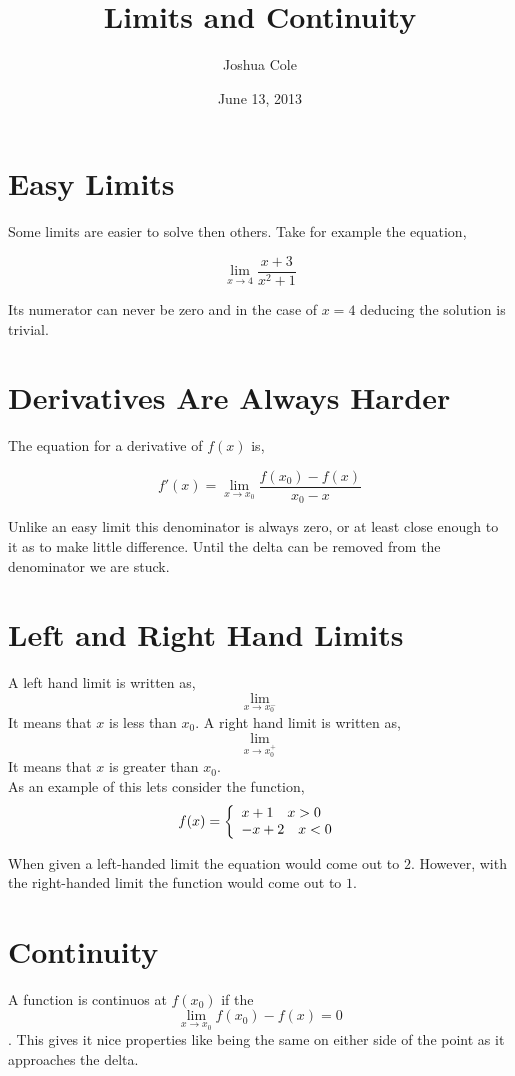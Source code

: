 \documentclass {article}
\begin{document}
\title {Limits and Continuity}
\author {Joshua Cole}
\date {June 13, 2013}
\maketitle

\section {Easy Limits}
Some limits are easier to solve then others. Take for example the equation,

$$\lim_{x \to 4} \frac {x+3} {x^2+1}$$

Its numerator can never be zero and in the case of $x=4$ deducing the solution is trivial.

\section {Derivatives Are Always Harder}
The equation for a derivative of $f(x)$ is,

$$f'(x)=\lim_{x \to x_0}\frac{f(x_0)-f(x)}{x_0-x}$$

Unlike an easy limit this denominator is always zero, or at least close enough to it as to make little difference. Until the delta can be removed from the denominator we are stuck.


\section {Left and Right Hand Limits}

A left hand limit is written as,
$$\lim_{x \to x_0^-}$$
It means that $x$ is less than $x_0$. A right hand limit is written as,
 $$\lim_{x \to x_0^+}$$
It means that $x$ is greater than $x_0$.\\

As an example of this lets consider the function,
$$f(x)=\left\{
\begin{array}{l l}
x+1 \quad x >0\\ 
-x+2 \quad x < 0
\end{array}
\right.$$

When given a left-handed limit the equation would come out to $2$. However, with the right-handed limit the function would come out to $1$.

\section {Continuity}
A function is continuos at $f(x_0)$ if the $$\lim_{x \to x_0} f(x_0)-f(x)=0$$. This gives it nice properties like being the same on either side of the point as it approaches the delta.
\end{document}
